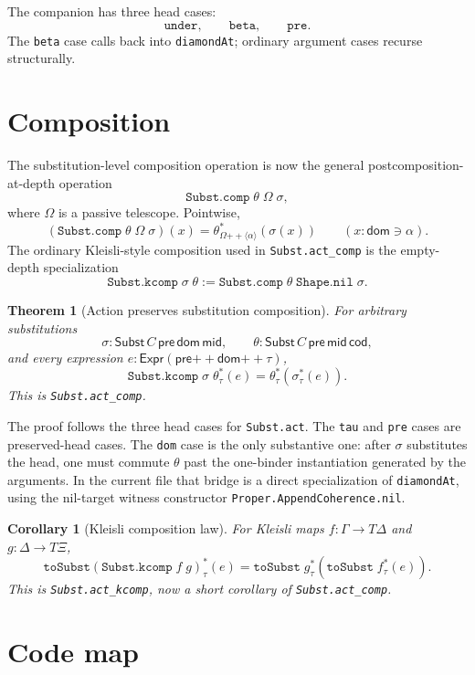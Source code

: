 \documentclass[11pt]{article}
\newtheorem{theorem}{Theorem}
\newtheorem{corollary}{Corollary}
\newcommand{\Code}[1]{\texttt{#1}}
\newcommand{\Expr}{\mathsf{Expr}}
\newcommand{\Subst}{\mathsf{Subst}}
\newcommand{\pre}{\mathsf{pre}}
\newcommand{\dom}{\mathsf{dom}}
\newcommand{\cod}{\mathsf{cod}}
\newcommand{\mshape}{\mathsf{mid}}
\newcommand{\Act}[3]{#1^{\ast}_{#2}(#3)}
\newcommand{\comp}{\mathbin{+\!\!+}}
\begin{document}
The companion has three head cases:
\[
  \Code{under},\qquad \Code{beta},\qquad \Code{pre}.
\]
The \Code{beta} case calls back into \Code{diamondAt}; ordinary argument
cases recurse structurally.

\section{Composition}

The substitution-level composition operation is now the general
postcomposition-at-depth operation
\[
  \Code{Subst.comp}\;\theta\;\Omega\;\sigma,
\]
where \(\Omega\) is a passive telescope.  Pointwise,
\[
  (\Code{Subst.comp}\;\theta\;\Omega\;\sigma)(x)
  =
  \Act{\theta}{\Omega\comp\langle\alpha\rangle}{\sigma(x)}
  \qquad(x : \dom \ni \alpha).
\]
The ordinary Kleisli-style composition used in \Code{Subst.act\_comp} is the
empty-depth specialization
\[
  \Code{Subst.kcomp}\;\sigma\;\theta
  :=
  \Code{Subst.comp}\;\theta\;\Code{Shape.nil}\;\sigma.
\]

\begin{theorem}[Action preserves substitution composition]
For arbitrary substitutions
\[
  \sigma : \Subst\,C\,\pre\,\dom\,\mshape,
  \qquad
  \theta : \Subst\,C\,\pre\,\mshape\,\cod,
\]
and every expression \(e : \Expr(\pre\comp\dom\comp\tau)\),
\[
  \Act{\Code{Subst.kcomp}\;\sigma\;\theta}{\tau}{e}
  =
  \Act{\theta}{\tau}{\Act{\sigma}{\tau}{e}}.
\]
This is \Code{Subst.act\_comp}.
\end{theorem}

The proof follows the three head cases for \Code{Subst.act}.  The
\Code{tau} and \Code{pre} cases are preserved-head cases.  The \Code{dom}
case is the only substantive one: after \(\sigma\) substitutes the head, one
must commute \(\theta\) past the one-binder instantiation generated by the
arguments.  In the current file that bridge is a direct specialization of
\Code{diamondAt}, using the nil-target witness constructor
\Code{Proper.AppendCoherence.nil}.

\begin{corollary}[Kleisli composition law]
For Kleisli maps \(f : \Gamma \to T\Delta\) and
\(g : \Delta \to T\Xi\),
\[
  \Act{\Code{toSubst}(\Code{Subst.kcomp}\;f\;g)}{\tau}{e}
  =
  \Act{\Code{toSubst}\;g}{\tau}
    {\Act{\Code{toSubst}\;f}{\tau}{e}}.
\]
This is \Code{Subst.act\_kcomp}, now a short corollary of
\Code{Subst.act\_comp}.
\end{corollary}

\section{Code map}
\end{document}
